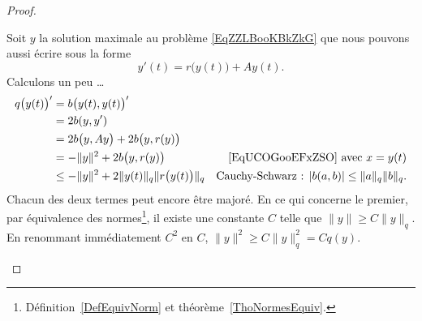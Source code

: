 \begin{proof}
\begin{subproof}
		Soit \( y\) la solution maximale au problème \eqref{EqZZLBooKBkZkG} que nous pouvons aussi écrire sous la forme
		\begin{equation}
			y'(t)=r\big( y(t) \big)+Ay(t).
		\end{equation}
		Calculons un peu \ldots
		\begin{subequations}    \label{subeqsZCOLooOzTBLr}
			\begin{align}
				q\big( y(t) \big)' & =b\big( y(t),y(t) \big)'                                                                                                    \\
				                   & =2b(y,y')                                                                                                                   \\
				                   & =2b\big( y,Ay \big)+2b\big( y,r(y) \big)                                                                                    \\
				                   & =-\| y \|^2+2b\big( y,r(y) \big)                       & \text{\eqref{EqUCOGooEFxZSO} avec } x=y(t)                         \\
				                   & \leq -\| y \|^2+2\| y(t) \|_q\| r\big( y(t) \big) \|_q & \text{Cauchy-Schwarz : } | b(a,b) |\leq \| a \|_q\| b \|_q\text{.}
			\end{align}
		\end{subequations}
		Chacun des deux termes peut encore être majoré. En ce qui concerne le premier, par équivalence des normes\footnote{Définition~\ref{DefEquivNorm} et théorème~\ref{ThoNormesEquiv}.}, il existe une constante \( C\) telle que \( \| y \|\geq C \| y \|_q\). En renommant immédiatement \( C^2\) en \( C\), \( \| y \|^2\geq C\| y \|_q^2=Cq(y)\).


\end{subproof}
\end{proof}
